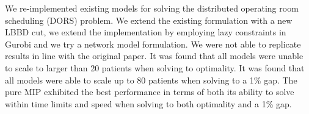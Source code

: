 We re-implemented existing models\cite{roshanaei2017propagating} for solving the distributed operating room scheduling (DORS) problem. We extend the existing formulation with a new LBBD cut, we extend the implementation by employing lazy constraints in Gurobi and we try a network model formulation. We were not able to replicate results in line with the original paper. It was found that all models were unable to scale to larger than 20 patients when solving to optimality. It was found that all models were able to scale up to 80 patients when solving to a 1\% gap. The pure MIP exhibited the best performance in terms of both its ability to solve within time limits and speed when solving to both optimality and a 1\% gap. 

